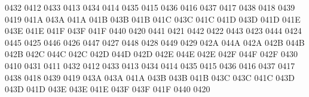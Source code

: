  0432 0412 %
 0433 0413 %
 0434 0414 %
 0435 0415 %
 0436 0416 %
 0437 0417 %
 0438 0418 %
 0439 0419 %
\setcclcucx 041A 043A 041A %
\setcclcucx 041B 043B 041B %
\setcclcucx 041C 043C 041C %
\setcclcucx 041D 043D 041D %
\setcclcucx 041E 043E 041E %
\setcclcucx 041F 043F 041F %
 0440 0420 %
 0441 0421 %
 0442 0422 %
 0443 0423 %
 0444 0424 %
 0445 0425 %
 0446 0426 %
 0447 0427 %
 0448 0428 %
 0449 0429 %
\setcclcucx 042A 044A 042A %
\setcclcucx 042B 044B 042B %
\setcclcucx 042C 044C 042C %
\setcclcucx 042D 044D 042D %
\setcclcucx 042E 044E 042E %
\setcclcucx 042F 044F 042F %
 0430 0410 %
 0431 0411 %
 0432 0412 %
 0433 0413 %
 0434 0414 %
 0435 0415 %
 0436 0416 %
 0437 0417 %
 0438 0418 %
 0439 0419 %
\setcclcucx 043A 043A 041A %
\setcclcucx 043B 043B 041B %
\setcclcucx 043C 043C 041C %
\setcclcucx 043D 043D 041D %
\setcclcucx 043E 043E 041E %
\setcclcucx 043F 043F 041F %
 0440 0420 %
